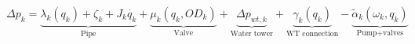 
\begin{equation}
\label{CompleteModel_extended}
\Delta p_k \!= \! \underbrace{\lambda_k (q_k) \!+ \! \zeta_k \!+ \! J_k \dot{q_k}}_\text{Pipe} \!+ \!\underbrace{\mu_k (q_k,OD_k)}_\text{Valve}\! + \!\underbrace{\Delta p_{wt,k}}_\text{Water tower} \!+\! \underbrace{\gamma_k (q_k)}_\text{WT connection}\! -\! \underbrace{\tilde{\alpha}_k(\omega_k,q_k)}_\text{Pump+valves}
\end{equation}

